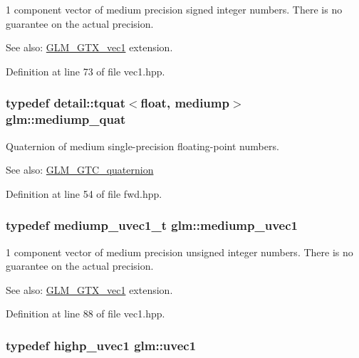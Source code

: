 1 component vector of medium precision signed integer numbers. There is no guarantee on the actual precision. \begin{Desc}
\item[See also:]\hyperlink{group__gtx__vec1}{GLM\_\-GTX\_\-vec1} extension. \end{Desc}


Definition at line 73 of file vec1.hpp.\hypertarget{namespaceglm_a891775f83d9da605b5dd0dc34a3ef62}{
\subsubsection[mediump\_\-quat]{\setlength{\rightskip}{0pt plus 5cm}typedef detail::tquat$<$float, mediump$>$ {\bf glm::mediump\_\-quat}}}
\label{namespaceglm_a891775f83d9da605b5dd0dc34a3ef62}


Quaternion of medium single-precision floating-point numbers.

\begin{Desc}
\item[See also:]\hyperlink{group__gtc__quaternion}{GLM\_\-GTC\_\-quaternion} \end{Desc}


Definition at line 54 of file fwd.hpp.\hypertarget{namespaceglm_1fa5a5fb993ee72b4dc8d2a9caf85b26}{
\subsubsection[mediump\_\-uvec1]{\setlength{\rightskip}{0pt plus 5cm}typedef mediump\_\-uvec1\_\-t {\bf glm::mediump\_\-uvec1}}}
\label{namespaceglm_1fa5a5fb993ee72b4dc8d2a9caf85b26}


1 component vector of medium precision unsigned integer numbers. There is no guarantee on the actual precision. \begin{Desc}
\item[See also:]\hyperlink{group__gtx__vec1}{GLM\_\-GTX\_\-vec1} extension. \end{Desc}


Definition at line 88 of file vec1.hpp.\hypertarget{namespaceglm_4e12bc23a3d060164eef452f81d92a03}{
\subsubsection[uvec1]{\setlength{\rightskip}{0pt plus 5cm}typedef {\bf highp\_\-uvec1} {\bf glm::uvec1}}}
\label{namespaceglm_4e12bc23a3d060164eef452f81d92a03}


